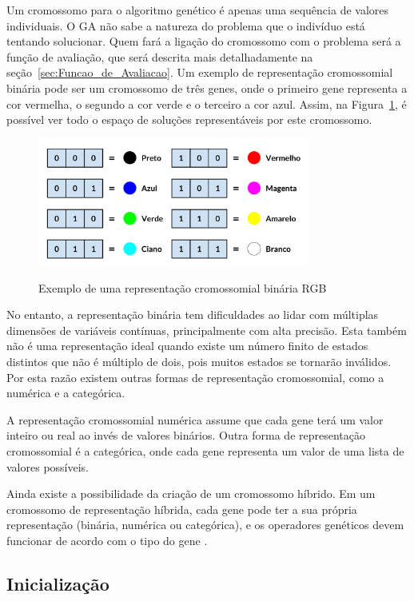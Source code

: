 \documentclass[12pt,oneside,a4paper,english,french,spanish,brazil,]{abntex2}
\begin{document}
Um cromossomo para o algoritmo genético é apenas uma sequência de valores individuais. O GA não sabe a natureza do problema que o indivíduo está tentando solucionar. Quem fará a ligação do cromossomo com o problema será a função de avaliação, que será descrita mais detalhadamente na seção~\ref{sec:Funcao_de_Avaliacao}. Um exemplo de representação cromossomial binária pode ser um cromossomo de três genes, onde o primeiro gene representa a cor vermelha, o segundo a cor verde e o terceiro a cor azul. Assim, na Figura~\ref{fig:GA_Cromossomo_RGB}, é possível ver todo o espaço de soluções representáveis por este cromossomo.

\begin{figure}[ht]
\centering
\caption{Exemplo de uma representação cromossomial binária RGB}
\includegraphics[width=0.8\textwidth]{imagens/GA_Cromossomo_RGB.pdf}
\sourceAuthor	
\label{fig:GA_Cromossomo_RGB}
\end{figure}

No entanto, a representação binária tem dificuldades ao lidar com múltiplas dimensões de variáveis contínuas, principalmente com alta precisão. Esta também não é uma representação ideal quando existe um número finito de estados distintos que não é múltiplo de dois, pois muitos estados se tornarão inválidos. Por esta razão existem outras formas de representação cromossomial, como a numérica e a categórica.

A representação cromossomial numérica assume que cada gene terá um valor inteiro ou real ao invés de valores binários. Outra forma de representação cromossomial é a categórica, onde cada gene representa um valor de uma lista de valores possíveis.

Ainda existe a possibilidade da criação de um cromossomo híbrido. Em um cromossomo de representação híbrida, cada gene pode ter a sua própria representação (binária, numérica ou categórica), e os operadores genéticos devem funcionar de acordo com o tipo do gene \cite{linden:2008}.

\subsection{Inicialização}
\end{document}
